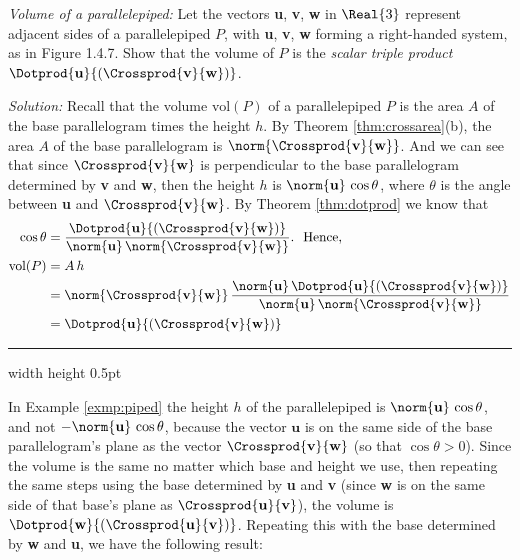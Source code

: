 \begin{exmp}\label{exmp:piped}
 \emph{Volume of a parallelepiped:} Let the vectors \textbf{u}, \textbf{v}, \textbf{w} in $\Real{3}$ represent adjacent
 sides of a parallelepiped $P$, with \textbf{u}, \textbf{v}, \textbf{w} forming a right-handed system,
 as in Figure 1.4.7. Show that the volume of $P$ is the
 \emph{scalar triple product}
 $\Dotprod{\textbf{u}}{(\Crossprod{\textbf{v}}{\textbf{w}})}$.
 \par\noindent \emph{Solution:} Recall that the volume $\text{vol}(P)$ of a parallelepiped $P$ is the area $A$ of the base parallelogram
 times the height $h$. By Theorem \ref{thm:crossarea}(b), the area $A$ of the base parallelogram is
 $\norm{\Crossprod{\textbf{v}}{\textbf{w}}}$. And we can see that since $\Crossprod{\textbf{v}}{\textbf{w}}$ is
 perpendicular to the base parallelogram determined by \textbf{v} and \textbf{w}, then the height $h$ is
 $\norm{\textbf{u}}\,\cos \theta$, where $\theta$ is the angle between \textbf{u} and
 $\Crossprod{\textbf{v}}{\textbf{w}}$. By Theorem \ref{thm:dotprod} we know that
 \begin{align*}
  \cos \theta &= \frac{\Dotprod{\textbf{u}}{(\Crossprod{\textbf{v}}{\textbf{w}})}}{\norm{\textbf{u}} \,
  \norm{\Crossprod{\textbf{v}}{\textbf{w}}}}. \text{~~Hence,}\\
  \text{vol}(P) &= A \, h\\
  &= \norm{\Crossprod{\textbf{v}}{\textbf{w}}} \,
  \frac{\norm{\textbf{u}} \, \Dotprod{\textbf{u}}{(\Crossprod{\textbf{v}}{\textbf{w}})}}{\norm{\textbf{u}} \,
  \norm{\Crossprod{\textbf{v}}{\textbf{w}}}}\\
  &= \Dotprod{\textbf{u}}{(\Crossprod{\textbf{v}}{\textbf{w}})}
 \end{align*}
\end{exmp}
\hrule width \textwidth height 0.5pt
\vspace{4mm}

In Example \ref{exmp:piped} the height $h$ of the parallelepiped is $\norm{\textbf{u}}\,\cos \theta$, and not
$-\norm{\textbf{u}}\,\cos \theta$, because the vector $\textbf{u}$ is on the same side of the base parallelogram's plane
as the vector $\Crossprod{\textbf{v}}{\textbf{w}}$ (so that $\cos \theta > 0$). Since the volume
is the same no matter which base and height we use, then repeating the same steps using
the base determined by \textbf{u} and \textbf{v} (since \textbf{w} is on the same side of that base's
plane as $\Crossprod{\textbf{u}}{\textbf{v}}$), the volume is
$\Dotprod{\textbf{w}}{(\Crossprod{\textbf{u}}{\textbf{v}})}$. Repeating this with the base determined by \textbf{w} and
\textbf{u}, we have the following result:\vspace{2mm}

